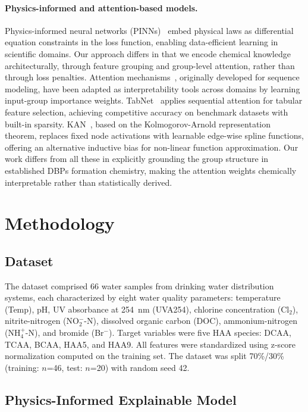 \documentclass[runningheads]{llncs}
\begin{document}
\paragraph{Physics-informed and attention-based models.}
Physics-informed neural networks (PINNs)~\cite{raissi2019physics} embed physical laws as differential equation constraints in the loss function, enabling data-efficient learning in scientific domains. Our approach differs in that we encode chemical knowledge architecturally, through feature grouping and group-level attention, rather than through loss penalties. Attention mechanisms~\cite{vaswani2017attention}, originally developed for sequence modeling, have been adapted as interpretability tools across domains by learning input-group importance weights. TabNet~\cite{arik2021tabnet} applies sequential attention for tabular feature selection, achieving competitive accuracy on benchmark datasets with built-in sparsity. KAN~\cite{liu2024kan}, based on the Kolmogorov-Arnold representation theorem, replaces fixed node activations with learnable edge-wise spline functions, offering an alternative inductive bias for non-linear function approximation. Our work differs from all these in explicitly grounding the group structure in established DBPs formation chemistry, making the attention weights chemically interpretable rather than statistically derived.


\section{Methodology}

\subsection{Dataset}

The dataset comprised 66 water samples from drinking water distribution systems, each characterized by eight water quality parameters: temperature (Temp), pH, UV absorbance at 254~nm (UVA254), chlorine concentration (Cl$_2$), nitrite-nitrogen (NO$_2^-$-N), dissolved organic carbon (DOC), ammonium-nitrogen (NH$_4^+$-N), and bromide (Br$^-$). Target variables were five HAA species: DCAA, TCAA, BCAA, HAA5, and HAA9. All features were standardized using z-score normalization computed on the training set. The dataset was split 70\%/30\% (training: $n$=46, test: $n$=20) with random seed 42.

\subsection{Physics-Informed Explainable Model}
\end{document}
